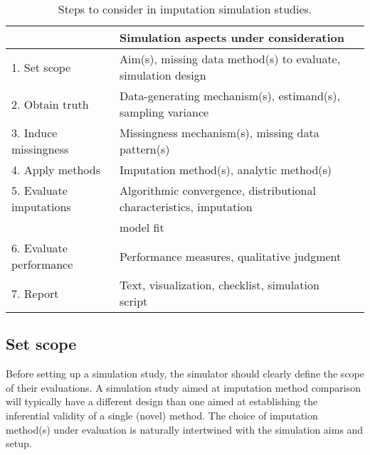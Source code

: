 \documentclass[bimj,fleqn]{w-art}
\begin{document}
\begin{table}[tb]
\begin{center}
\caption{Steps to consider in imputation simulation studies.}
\label{table:steps}
\begin{tabular}{lll}
\hline
                        & Simulation aspects under consideration \\
\hline  
1. Set scope            & Aim(s), missing data method(s) to evaluate, simulation design \\
2. Obtain truth         & Data-generating mechanism(s), estimand(s), sampling variance \\
3. Induce missingness   & Missingness mechanism(s), missing data pattern(s) \\
4. Apply methods        & Imputation method(s), analytic method(s) \\
5. Evaluate imputations & Algorithmic convergence, distributional characteristics, imputation \\
                        & model fit \\
6. Evaluate performance & Performance measures, qualitative judgment \\
7. Report               & Text, visualization, checklist, simulation script \\
\hline
\end{tabular}
\end{center}
\end{table}



\subsection{Set scope}

Before setting up a simulation study, the simulator should clearly define the scope of their evaluations. A simulation study aimed at imputation method comparison will typically have a different design than one aimed at establishing the inferential validity of a single (novel) method. The choice of imputation method(s) under evaluation is naturally intertwined with the simulation aims and setup.
\end{document}
